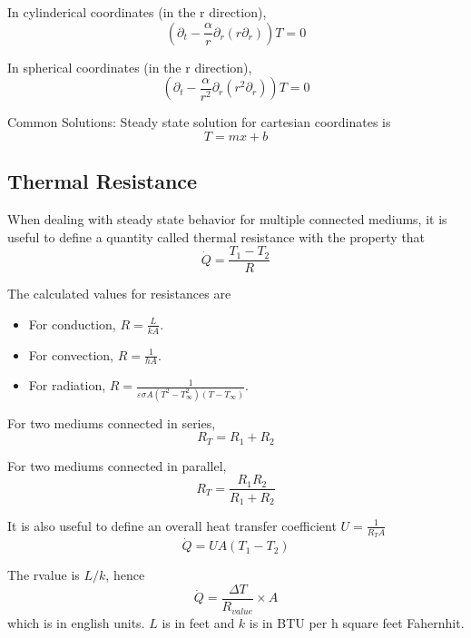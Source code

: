 \documentclass[a4paper]{article}
\numberwithin{equation}{section}
\begin{document}
	In cylinderical coordinates (in the r direction), 
	\begin{equation}
		(\partial_t-\frac{\alpha}{r}\partial_r(r\partial_r)) T = 0
	\end{equation}
	
	In spherical coordinates (in the r direction),
	\begin{equation}
		(\partial_t-\frac{\alpha}{r^2}\partial_r(r^2\partial_r)) T = 0
	\end{equation}
	
	Common Solutions:
	Steady state solution for cartesian coordinates is
	\begin{equation}
		T = mx+b
	\end{equation}

	\subsection{Thermal Resistance}

	When dealing with steady state behavior for multiple connected mediums, it is useful to define a quantity called thermal resistance with the property that 
	\begin{equation}
		\dot Q=\frac{T_1-T_2}{R}
	\end{equation}

	The calculated values for resistances are
	\begin{itemize}
		\item For conduction, $R=\frac{L}{kA}$.
		\item For convection, $R=\frac{1}{hA}$.
		\item For radiation, $R=\frac{1}{\varepsilon\sigma A(T^2-T_\infty^2)(T-T_\infty)}$.
	\end{itemize}

	For two mediums connected in series,
	\begin{equation}
		R_T=R_1+R_2
	\end{equation}

	For two mediums connected in parallel,
	\begin{equation}
		R_T=\frac{R_1R_2}{R_1+R_2}
	\end{equation}

	It is also useful to define an overall heat transfer coefficient $U=\frac{1}{R_TA}$
	\begin{equation}
		\dot Q=UA(T_1-T_2)
	\end{equation}

	The rvalue is $L/k$, hence
	\begin{equation}
		\dot Q=\frac{\Delta T}{R_{value}}\times A
	\end{equation}
	which is in english units. $L$ is in feet and $k$ is in BTU per h square feet Fahernhit.
\end{document}
